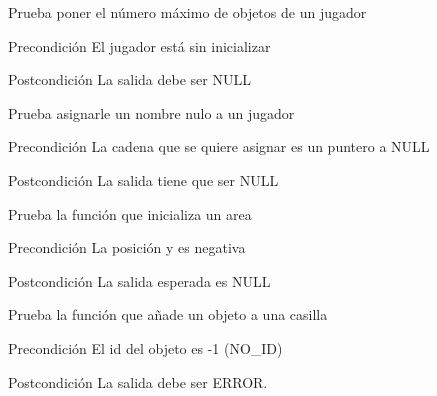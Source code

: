 \begin{DoxyRefList}
\item[\label{test__test000231}%
\hypertarget{test__test000231}{}%
Global \hyperlink{player__test_8c_aa40042cc9c7916afea057534cf1180a6}{test3\-\_\-player\-\_\-set\-\_\-max\-\_\-objects} ()]Prueba poner el número máximo de objetos de un jugador \begin{DoxyPrecond}{Precondición}
El jugador está sin inicializar 
\end{DoxyPrecond}
\begin{DoxyPostcond}{Postcondición}
La salida debe ser N\-U\-L\-L  
\end{DoxyPostcond}

\item[\label{test__test000206}%
\hypertarget{test__test000206}{}%
Global \hyperlink{player__test_8c_a447ebbb4ba2206abeaf4b60200e312da}{test3\-\_\-player\-\_\-set\-\_\-name} ()]Prueba asignarle un nombre nulo a un jugador \begin{DoxyPrecond}{Precondición}
La cadena que se quiere asignar es un puntero a N\-U\-L\-L 
\end{DoxyPrecond}
\begin{DoxyPostcond}{Postcondición}
La salida tiene que ser N\-U\-L\-L  
\end{DoxyPostcond}

\item[\label{test__test000236}%
\hypertarget{test__test000236}{}%
Global \hyperlink{screen__test_8c_a45a32f2dbd9bf11f241873f78a1549e4}{test3\-\_\-screen\-\_\-area\-\_\-init} ()]Prueba la función que inicializa un area \begin{DoxyPrecond}{Precondición}
La posición y es negativa 
\end{DoxyPrecond}
\begin{DoxyPostcond}{Postcondición}
La salida esperada es N\-U\-L\-L  
\end{DoxyPostcond}

\item[\label{test__test000306}%
\hypertarget{test__test000306}{}%
Global \hyperlink{space__test_8c_ac6abb97e2aa0f1dd44d47732adcf6329}{test3\-\_\-space\-\_\-add\-\_\-object} ()]Prueba la función que añade un objeto a una casilla \begin{DoxyPrecond}{Precondición}
El id del objeto es -\/1 (N\-O\-\_\-\-I\-D) 
\end{DoxyPrecond}
\begin{DoxyPostcond}{Postcondición}
La salida debe ser E\-R\-R\-O\-R.  
\end{DoxyPostcond}


\end{DoxyRefList}
